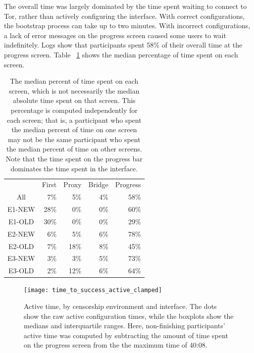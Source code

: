 \documentclass[USenglish,oneside,twocolumn]{article}
\begin{document}
The overall time was largely dominated by the time spent waiting to connect to Tor, rather than actively configuring the interface. With correct configurations, the bootstrap process can take up to two minutes.  With incorrect configurations, a lack of error messages on the progress screen caused some users to wait indefinitely.  Logs show that participants spent 58\% of their overall time at the progress screen. Table ~\ref{table:median_time} shows the median percentage of time spent on each screen. 

\begin{table}[t]
\centering
	\begin{tabular}{c r r r r}
	& First & Proxy & Bridge & Progress \\
	\noalign{\hrule}
	All & 7\% & 5\% & 4\% & 58\% \\
	E1-NEW & 28\% & 0\% & 0\% & 60\% \\
	E1-OLD & 30\% & 0\% & 0\% & 29\% \\
	E2-NEW & 6\% & 5\% & 6\% & 78\% \\
	E2-OLD & 7\% & 18\% & 8\% & 45\% \\
	E3-NEW & 3\% & 3\% & 5\% & 73\% \\
	E3-OLD & 2\% & 12\% & 6\% & 64\% \\
	\end{tabular}
\caption{The median percent of time spent on each screen, which is not
necessarily the median absolute time spent on that screen. 
This percentage is computed independently for each screen; that is, a participant who spent the median percent 
of time on one screen may not be the same participant who spent the median percent
of time on other screens. Note that the time spent on the progress bar dominates the 
time spent in the interface.} 
\label{table:median_time}
\end{table}

\begin{figure}[t]
\centering
\texttt{[image: time\_to\_success\_active\_clamped]}
\caption{
Active time, by censorship environment and interface.
The dots show the raw active configuration times,
while the boxplots show the medians and interquartile ranges.
Here, non-finishing participants' active time was computed by
subtracting the amount of time spent on the progress screen from the 
the maximum time of 40:08.
}
\label{fig:time_to_success_active_clamped}
\end{figure}
\end{document}
